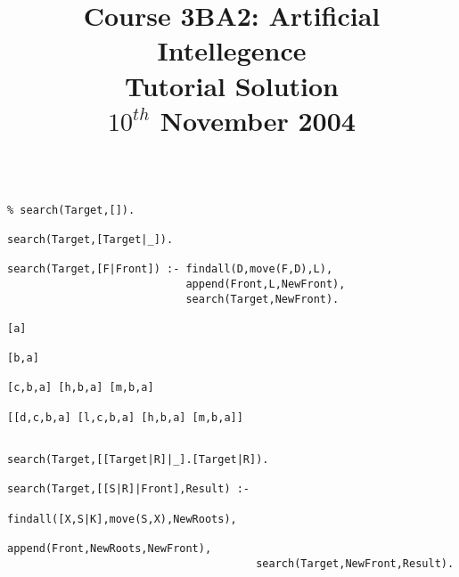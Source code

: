 \documentclass[a4paper,12pt]{article}
\begin{document}
\title{Course 3BA2: Artificial Intellegence \\ Tutorial Solution\\ $10^{th}$ November 2004}

\maketitle

\begin{verbatim}

% search(Target,[]).

search(Target,[Target|_]).

search(Target,[F|Front]) :- findall(D,move(F,D),L),
                            append(Front,L,NewFront),
                            search(Target,NewFront).

[a]

[b,a]

[c,b,a] [h,b,a] [m,b,a]

[[d,c,b,a] [l,c,b,a] [h,b,a] [m,b,a]]

\end{verbatim}

\pagebreak

\begin{verbatim}

search(Target,[[Target|R]|_].[Target|R]).

search(Target,[[S|R]|Front],Result) :- 
                                       findall([X,S|K],move(S,X),NewRoots),
                                       append(Front,NewRoots,NewFront),
                                       search(Target,NewFront,Result).

\end{verbatim}
\end{document}
